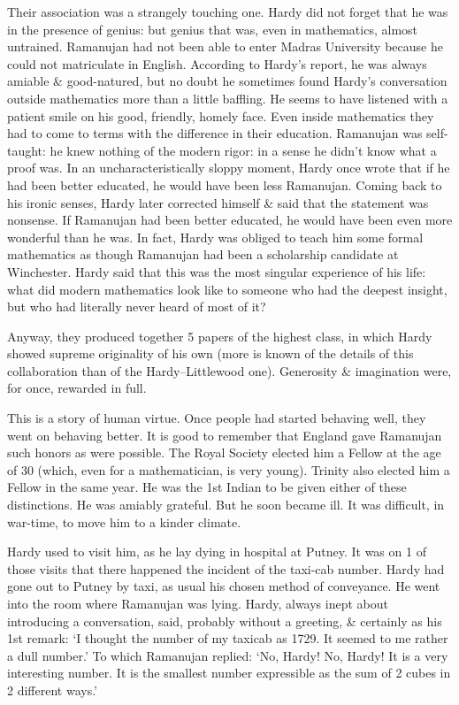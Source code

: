 \documentclass{article}
\numberwithin{equation}{section}
\begin{document}
Their association was a strangely touching one. Hardy did not forget that he was in the presence of genius: but genius that was, even in mathematics, almost untrained. Ramanujan had not been able to enter Madras University because he could not matriculate in English. According to Hardy's report, he was always amiable \& good-natured, but no doubt he sometimes found Hardy's conversation outside mathematics more than a little baffling. He seems to have listened with a patient smile on his good, friendly, homely face. Even inside mathematics they had to come to terms with the difference in their education. Ramanujan was self-taught: he knew nothing of the modern rigor: in a sense he didn't know what a proof was. In an uncharacteristically sloppy moment, Hardy once wrote that if he had been better educated, he would have been less Ramanujan. Coming back to his ironic senses, Hardy later corrected himself \& said that the statement was nonsense. If Ramanujan had been better educated, he would have been even more wonderful than he was. In fact, Hardy was obliged to teach him some formal mathematics as though Ramanujan had been a scholarship candidate at Winchester. Hardy said that this was the most singular experience of his life: what did modern mathematics look like to someone who had the deepest insight, but who had literally never heard of most of it?

Anyway, they produced together 5 papers of the highest class, in which Hardy showed supreme originality of his own (more is known of the details of this collaboration than of the Hardy--Littlewood one). Generosity \& imagination were, for once, rewarded in full.

This is a story of human virtue. Once people had started behaving well, they went on behaving better. It is good to remember that England gave Ramanujan such honors as were possible. The Royal Society elected him a Fellow at the age of 30 (which, even for a mathematician, is very young). Trinity also elected him a Fellow in the same year. He was the 1st Indian to be given either of these distinctions. He was amiably grateful. But he soon became ill. It was difficult, in war-time, to move him to a kinder climate.

Hardy used to visit him, as he lay dying in hospital at Putney. It was on 1 of those visits that there happened the incident of the taxi-cab number. Hardy had gone out to Putney by taxi, as usual his chosen method of conveyance. He went into the room where Ramanujan was lying. Hardy, always inept about introducing a conversation, said, probably without a greeting, \& certainly as his 1st remark: `I thought the number of my taxicab as 1729. It seemed to me rather a dull number.' To which Ramanujan replied: `No, Hardy! No, Hardy! It is a very interesting number. It is the smallest number expressible as the sum of 2 cubes in 2 different ways.'
\end{document}
